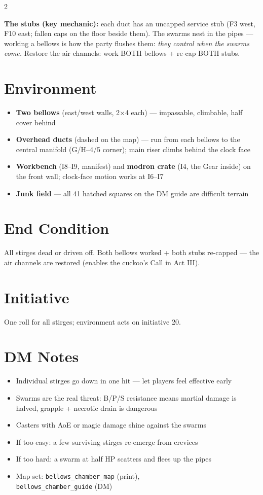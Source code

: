 \documentclass[10pt,letterpaper]{article}
\begin{document}
\begin{multicols}{2}
\vspace{4pt}

\textbf{The stubs (key mechanic):} each duct has an uncapped service stub (F3 west, F10 east; fallen caps on the floor beside them). The swarms nest in the pipes --- working a bellows is how the party flushes them: \textit{they control when the swarms come.} Restore the air channels: work BOTH bellows + re-cap BOTH stubs.

\columnbreak

\section*{Environment}
\begin{itemize}
\item \textbf{Two bellows} (east/west walls, 2$\times$4 each) --- impassable, climbable, half cover behind
\item \textbf{Overhead ducts} (dashed on the map) --- run from each bellows to the central manifold (G/H--4/5 corner); main riser climbs behind the clock face
\item \textbf{Workbench} (I8--I9, manifest) and \textbf{modron crate} (I4, the Gear inside) on the front wall; clock-face motion works at I6--I7
\item \textbf{Junk field} --- all 41 hatched squares on the DM guide are difficult terrain
\end{itemize}

\section*{End Condition}
All stirges dead or driven off. Both bellows worked + both stubs re-capped --- the air channels are restored (enables the cuckoo's Call in Act III).

\section*{Initiative}
One roll for all stirges; environment acts on initiative 20.

\section*{DM Notes}
\begin{itemize}
\item Individual stirges go down in one hit --- let players feel effective early
\item Swarms are the real threat: B/P/S resistance means martial damage is halved, grapple + necrotic drain is dangerous
\item Casters with AoE or magic damage shine against the swarms
\item If too easy: a few surviving stirges re-emerge from crevices
\item If too hard: a swarm at half HP scatters and flees up the pipes
\item Map set: \texttt{bellows\_chamber\_map} (print),\\ \texttt{bellows\_chamber\_guide} (DM)
\end{itemize}

\end{multicols}
\end{document}
